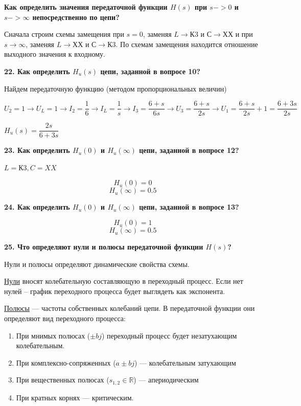 \textbf{
    Как определить значения 
    передаточной функции $ H(s) $ при 
    $ s -> 0 $ и $ s -> \infty $ 
    непосредственно по цепи?
}

Сначала строим схемы замещения 
при $ s = 0 $,
заменяя $ L \rightarrow К3 $ и $ С \rightarrow ХХ $
и при $ s \rightarrow \infty $,
заменяя $ L \rightarrow ХХ $ и $ С \rightarrow К3 $.
По схемам замещения находится
отношение выходного значения к входному. 

\textbf{
    22. Как определить $ H_{u}(s) $ цепи, 
    заданной в вопросе 10?
}

Найдем передаточную функцию (методом пропорциональных величин)
 
$ 
U_{2} = 
                1 \rightarrow U_{L} = 
                1 \rightarrow I_{2} = 
     \dfrac{1}{6} \rightarrow I_{L} = 
     \dfrac{1}{s} \rightarrow I_{3} = 
\dfrac{6 + s}{6s} \rightarrow U_{3} = 
\dfrac{6 + s}{2s} \rightarrow U_{1} = 
              \dfrac{6 + s}{2s} + 1 =
              \dfrac{6 + 3s}{2s}
$

$ H_{u}(s) = \dfrac{2s}{6 + 3s} $

\textbf{
    23. Как определить 
    $ H_{u}(0) $ и $ H_{u}(\infty) $ цепи, 
    заданной в вопросе 12?
}

$ L = К3, C = XX $

$$ H_{u}(0) = 0 $$
$$ H_{u}(\infty) = 0.5 $$

\textbf{
    24. Как определить 
    $ H_{u}(0) $ и $ H_{u}(\infty) $ цепи, 
    заданной в вопросе 13?
}

$$ H_{u}(0) = 1 $$
$$ H_{u}(\infty) = 0.5 $$

\textbf{
    25. Что определяют нули и полюсы 
    передаточной функции $ H(s) $?
}

Нули и полюсы определяют динамические свойства схемы.

\underline{Нули} вносят колебательную составляющую в переходный процесс.
Если нет нулей -- 
график переходного процесса будет выглядеть как экспонента. 

\underline{Полюсы} --- частоты собственных колебаний цепи. 
В передаточной функции они определяют вид переходного процесса:

\begin{enumerate}
    \item При мнимых полюсах ($ \pm bj $) 
    переходный процесс будет незатухающим колебательным.
    \item При комплексно-сопряженных ($ a \pm bj $) --- 
    колебательным затухающим
    \item При вещественных полюсах ($ s_{1,2} \in \mathbb{R} $) --- апериодическим
    \item При кратных корнях --- критическим. 
\end{enumerate}

